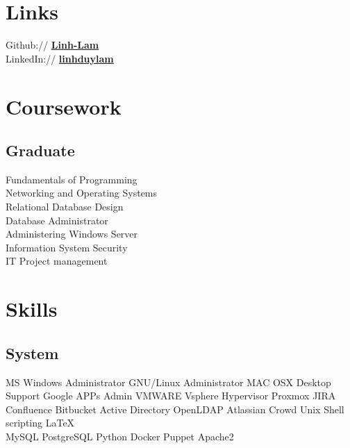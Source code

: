 \documentclass[letterpaper]{deedy-resume} %
\begin{document}
\begin{minipage}[t]{0.33\textwidth}
\section{Links} 

Github:// \href{https://github.com/Linh-Lam}{\bf Linh-Lam} \\
LinkedIn:// \href{https://vn.linkedin.com/in/linhduylam}{\bf linhduylam} \\

\sectionspace %


\section{Coursework}

\subsection{Graduate}

Fundamentals of Programming \\
Networking and Operating Systems\\
Relational Database Design \\
Database Administrator \\
Administering Windows Server \\
Information System Security \\
IT Project management \\


\sectionspace %


\section{Skills}

\subsection{System}

\sectionspace
MS Windows Administrator \textbullet{} GNU/Linux Administrator \textbullet{} MAC OSX Desktop Support
Google APPs Admin \textbullet{} VMWARE Vsphere Hypervisor \textbullet{} Proxmox \textbullet{} JIRA \textbullet{} Confluence \textbullet{} Bitbucket \textbullet{}
Active Directory \textbullet{} OpenLDAP \textbullet{} Atlassian Crowd \textbullet{}
Unix Shell scripting \textbullet{}\LaTeX\\
\sectionspace
{}
\sectionspace
MySQL \textbullet{} PostgreSQL \textbullet{} Python \textbullet{} Docker \textbullet{} Puppet \textbullet{} Apache2\\


\end{minipage}
\end{document}
